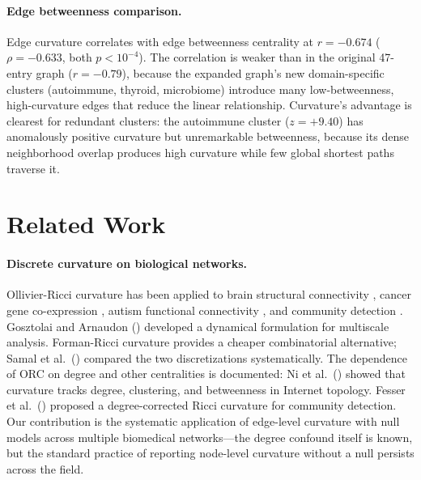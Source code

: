 \documentclass[11pt]{article}
\begin{document}
\paragraph{Edge betweenness comparison.} Edge curvature correlates with edge betweenness centrality at $r = -0.674$ ($\rho = -0.633$, both $p < 10^{-4}$). The correlation is weaker than in the original 47-entry graph ($r = -0.79$), because the expanded graph's new domain-specific clusters (autoimmune, thyroid, microbiome) introduce many low-betweenness, high-curvature edges that reduce the linear relationship. Curvature's advantage is clearest for redundant clusters: the autoimmune cluster ($z = +9.40$) has anomalously positive curvature but unremarkable betweenness, because its dense neighborhood overlap produces high curvature while few global shortest paths traverse it.

\section{Related Work}

\paragraph{Discrete curvature on biological networks.} Ollivier-Ricci curvature has been applied to brain structural connectivity \citep{farooq2019network}, cancer gene co-expression \citep{sandhu2015graph}, autism functional connectivity \citep{simhal2020measuring, elumalai2022graph}, and community detection \citep{ni2019community, sia2019ollivier}. Gosztolai and Arnaudon (\citeyear{gosztolai2021unfolding}) developed a dynamical formulation for multiscale analysis. Forman-Ricci curvature \citep{sreejith2016forman} provides a cheaper combinatorial alternative; Samal et al.\ (\citeyear{samal2018comparative}) compared the two discretizations systematically. The dependence of ORC on degree and other centralities is documented: Ni et al.\ (\citeyear{ni2015ricci}) showed that curvature tracks degree, clustering, and betweenness in Internet topology. Fesser et al.\ (\citeyear{fesser2024degreecorrected}) proposed a degree-corrected Ricci curvature for community detection. Our contribution is the systematic application of edge-level curvature with null models across multiple biomedical networks---the degree confound itself is known, but the standard practice of reporting node-level curvature without a null persists across the field.
\end{document}

